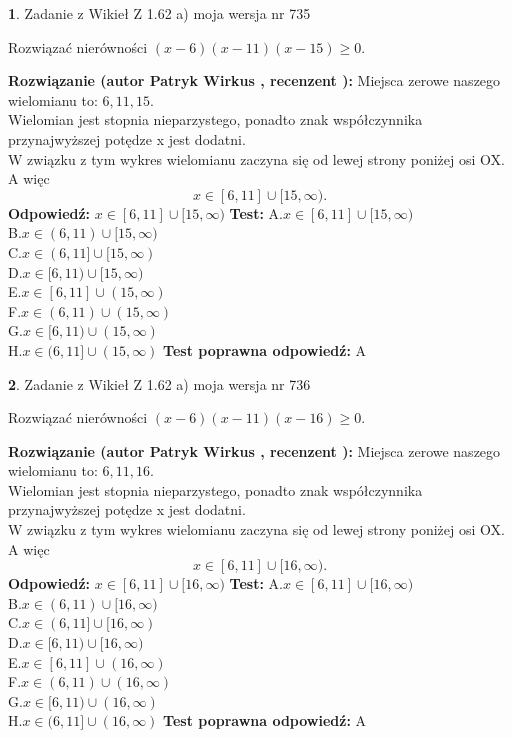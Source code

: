 \documentclass[12pt, a4paper]{article}
\theoremstyle{definition} %
\newtheorem{zad}{}
\newcommand{\zadStart}[1]{\begin{zad}#1\newline}
\newcommand{\zadStop}{\end{zad}}
\newcommand{\rozwStart}[2]{\noindent \textbf{Rozwiązanie (autor #1 , recenzent #2): }\newline}
\newcommand{\rozwStop}{\newline}
\newcommand{\odpStart}{\noindent \textbf{Odpowiedź:}\newline}
\newcommand{\odpStop}{\newline}
\newcommand{\testStart}{\noindent \textbf{Test:}\newline}
\newcommand{\testStop}{\newline}
\newcommand{\kluczStart}{\noindent \textbf{Test poprawna odpowiedź:}\newline}
\newcommand{\kluczStop}{\newline}
\begin{document}
\zadStart{Zadanie z Wikieł Z 1.62 a) moja wersja nr 735}

Rozwiązać nierówności $(x-6)(x-11)(x-15)\ge0$.
\zadStop
\rozwStart{Patryk Wirkus}{}
Miejsca zerowe naszego wielomianu to: $6, 11, 15$.\\
Wielomian jest stopnia nieparzystego, ponadto znak współczynnika przy\linebreak najwyższej potędze x jest dodatni.\\ W związku z tym wykres wielomianu zaczyna się od lewej strony poniżej osi OX. A więc $$x \in [6,11] \cup [15,\infty).$$
\rozwStop
\odpStart
$x \in [6,11] \cup [15,\infty)$
\odpStop
\testStart
A.$x \in [6,11] \cup [15,\infty)$\\
B.$x \in (6,11) \cup [15,\infty)$\\
C.$x \in (6,11] \cup [15,\infty)$\\
D.$x \in [6,11) \cup [15,\infty)$\\
E.$x \in [6,11] \cup (15,\infty)$\\
F.$x \in (6,11) \cup (15,\infty)$\\
G.$x \in [6,11) \cup (15,\infty)$\\
H.$x \in (6,11] \cup (15,\infty)$
\testStop
\kluczStart
A
\kluczStop



\zadStart{Zadanie z Wikieł Z 1.62 a) moja wersja nr 736}

Rozwiązać nierówności $(x-6)(x-11)(x-16)\ge0$.
\zadStop
\rozwStart{Patryk Wirkus}{}
Miejsca zerowe naszego wielomianu to: $6, 11, 16$.\\
Wielomian jest stopnia nieparzystego, ponadto znak współczynnika przy\linebreak najwyższej potędze x jest dodatni.\\ W związku z tym wykres wielomianu zaczyna się od lewej strony poniżej osi OX. A więc $$x \in [6,11] \cup [16,\infty).$$
\rozwStop
\odpStart
$x \in [6,11] \cup [16,\infty)$
\odpStop
\testStart
A.$x \in [6,11] \cup [16,\infty)$\\
B.$x \in (6,11) \cup [16,\infty)$\\
C.$x \in (6,11] \cup [16,\infty)$\\
D.$x \in [6,11) \cup [16,\infty)$\\
E.$x \in [6,11] \cup (16,\infty)$\\
F.$x \in (6,11) \cup (16,\infty)$\\
G.$x \in [6,11) \cup (16,\infty)$\\
H.$x \in (6,11] \cup (16,\infty)$
\testStop
\kluczStart
A
\kluczStop
\end{document}
